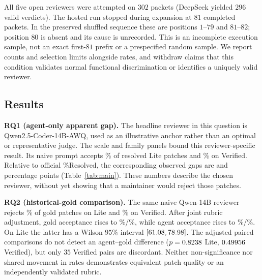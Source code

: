 \documentclass[10pt,conference]{IEEEtran}
\begin{document}
All five open reviewers were attempted on $302$ packets (DeepSeek yielded $296$ valid
verdicts). The hosted run stopped during expansion at $81$ completed packets. In the
preserved shuffled sequence these are positions $1$--$79$ and $81$--$82$; position $80$ is
absent and its cause is unrecorded. This is an incomplete execution sample, not an exact
first-$81$ prefix or a prespecified random sample. We report counts and selection limits
alongside rates, and withdraw claims that this condition validates normal functional
discrimination or identifies a uniquely valid reviewer.

\subsection{Results}
\label{sec:results}
\begin{table}[t]
\centering
\caption{Review-based acceptance under naive vs.\ adjusted reviewers. RAP and
gold-acceptance are percentages; the naive reviewer rejects nearly all merged code in the headline Qwen-14B setting. Adjusted Qwen comparisons do not detect a paired difference; this is not an equivalence result (exact McNemar $p$). Each row has $n$ valid agent and gold verdicts.}
\label{tab:main}
\small

\end{table}




\textbf{RQ1 (agent-only apparent gap).} The headline reviewer in this question is
Qwen2.5-Coder-14B-AWQ, used as an illustrative anchor rather than an optimal or
representative judge. The scale and family panels bound this reviewer-specific result.
Its naive prompt accepts \strictRAPLite\% of resolved Lite patches
and \strictRAPVerified\% on Verified. Relative to official \%Resolved, the corresponding
observed gaps are \strictGapLite{} and \strictGapVerified{} percentage points
(Table~\ref{tab:main}). These numbers describe the chosen reviewer, without yet showing
that a maintainer would reject those patches.

\textbf{RQ2 (historical-gold comparison).} The same naive Qwen-14B reviewer rejects
\strictFalseRejLite\% of gold patches on Lite and \strictFalseRejVerified\% on Verified.
After joint rubric adjustment, gold acceptance rises to
\calGoldMergeLite\%/\calGoldMergeVerified\%, while agent acceptance rises to
\calRAPLite\%/\calRAPVerified\%. On Lite the latter has a Wilson $95\%$ interval
$[61.08,78.98]$. The adjusted paired comparisons do not detect an
agent--gold difference ($p=0.8238$ Lite, $0.49956$ Verified), but
only $35$ Verified pairs are discordant. Neither non-significance nor shared movement in
rates demonstrates equivalent patch quality or an independently validated rubric.
\end{document}
